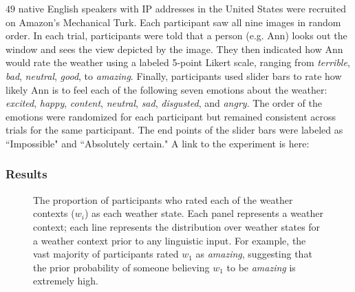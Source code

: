 \documentclass[10pt,letterpaper]{article}
\begin{document}
$49$ native English speakers with IP addresses in the United States were recruited on Amazon's Mechanical Turk. Each participant saw all nine images in random order. In each trial, participants were told that a person (e.g. Ann) looks out the window and sees the view depicted by the image. They then indicated how Ann would rate the weather using a labeled 5-point Likert scale, ranging from \emph{terrible}, \emph{bad}, \emph{neutral}, \emph{good}, to \emph{amazing}. Finally, participants used slider bars to rate how likely Ann is to feel each of the following seven emotions about the weather: \emph{excited}, \emph{happy}, \emph{content}, \emph{neutral}, \emph{sad}, \emph{disgusted}, and \emph{angry}.  The order of the emotions were randomized for each participant but remained consistent across trials for the same participant. The end points of the slider bars were labeled as ``Impossible" and ``Absolutely certain." A link to the experiment is here:
  
\subsubsection{Results}
\begin{figure}[t]
\caption{The proportion of participants who rated each of the weather contexts ($w_i$) as each weather state. Each panel represents a weather context; each line represents the distribution over weather states for a weather context prior to any linguistic input. For example, the vast majority of participants rated $w_1$ as \emph{amazing}, suggesting that the prior probability of someone believing $w_1$ to be \emph{amazing} is extremely high.}
\label{priors}
\end{figure}
\end{document}
